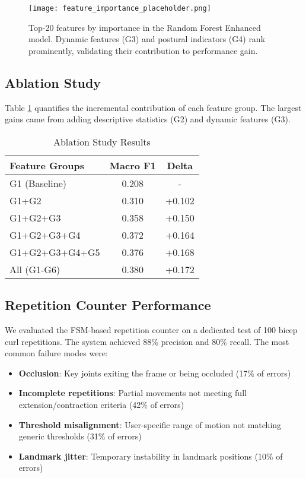 \documentclass[conference]{IEEEtran}
\begin{document}
\begin{figure}[ht]
\centering
\texttt{[image: feature\_importance\_placeholder.png]}
\caption{Top-20 features by importance in the Random Forest Enhanced model. Dynamic features (G3) and postural indicators (G4) rank prominently, validating their contribution to performance gain.}
\label{fig:importance}
\end{figure}

\subsection{Ablation Study}
Table \ref{tab:ablation} quantifies the incremental contribution of each feature group. The largest gains came from adding descriptive statistics (G2) and dynamic features (G3).

\begin{table}[ht]
\caption{Ablation Study Results}
\label{tab:ablation}
\centering
\begin{tabular}{lcc}
\toprule
\textbf{Feature Groups} & \textbf{Macro F1} & \textbf{Delta} \\
\midrule
G1 (Baseline) & 0.208 & - \\
G1+G2 & 0.310 & +0.102 \\
G1+G2+G3 & 0.358 & +0.150 \\
G1+G2+G3+G4 & 0.372 & +0.164 \\
G1+G2+G3+G4+G5 & 0.376 & +0.168 \\
All (G1-G6) & 0.380 & +0.172 \\
\bottomrule
\end{tabular}
\end{table}

\subsection{Repetition Counter Performance}
We evaluated the FSM-based repetition counter on a dedicated test of 100 bicep curl repetitions. The system achieved 88\% precision and 80\% recall. The most common failure modes were:

\begin{itemize}
    \item \textbf{Occlusion}: Key joints exiting the frame or being occluded (17\% of errors)
    \item \textbf{Incomplete repetitions}: Partial movements not meeting full extension/contraction criteria (42\% of errors)
    \item \textbf{Threshold misalignment}: User-specific range of motion not matching generic thresholds (31\% of errors)
    \item \textbf{Landmark jitter}: Temporary instability in landmark positions (10\% of errors)
\end{itemize}
\end{document}
